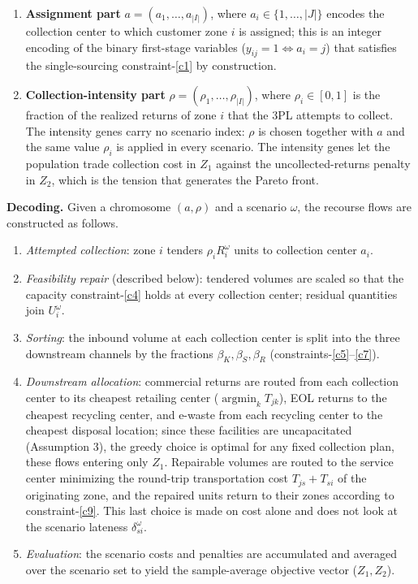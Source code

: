 \documentclass[11pt, a4paper]{article}
\DeclareMathOperator*{\argmin}{argmin}
\begin{document}
\begin{enumerate}
\def\labelenumi{\arabic{enumi}.}
\item
  \textbf{Assignment part} $a = (a_1, \ldots, a_{|I|})$, where $a_i \in \{1, \ldots, |J|\}$ encodes the collection center to which customer zone $i$ is assigned; this is an integer encoding of the binary first-stage variables ($y_{ij} = 1 \Leftrightarrow a_i = j$) that satisfies the single-sourcing constraint-\eqref{c1} by construction.
\item
  \textbf{Collection-intensity part}
  $\rho = (\rho_1, \ldots, \rho_{|I|})$, where $\rho_i \in [0,1]$ is the fraction of the realized returns of zone $i$ that the 3PL attempts to collect. The intensity genes carry no scenario index: $\rho$ is chosen together with $a$ and the same value $\rho_i$ is applied in every scenario. The intensity genes let the population trade collection cost in $Z_1$ against the uncollected-returns penalty in $Z_2$, which is the tension that generates the Pareto
  front.
\end{enumerate}

\textbf{Decoding.} Given a chromosome $(a, \rho)$ and a scenario $\omega$, the recourse flows are constructed as follows.

\begin{enumerate}
\def\labelenumi{\arabic{enumi}.}
\item
  \emph{Attempted collection}: zone $i$ tenders $\rho_i R_i^{\omega}$ units to collection center $a_i$.
\item
  \emph{Feasibility repair} (described below): tendered volumes are
  scaled so that the capacity constraint-\eqref{c4} holds at every collection center; residual quantities join $U_i^{\omega}$.
\item
  \emph{Sorting}: the inbound volume at each collection center is split into the three downstream channels by the fractions $\beta_K, \beta_S, \beta_R$ (constraints-\eqref{c5}--\eqref{c7}).
\item
  \emph{Downstream allocation}: commercial returns are routed from each collection center to its cheapest retailing center ($\argmin_k T_{jk}$), EOL returns to the cheapest recycling center, and e-waste from each recycling center to the cheapest disposal location; since these facilities are uncapacitated (Assumption 3), the
  greedy choice is optimal for any fixed collection plan, these flows entering only $Z_1$. Repairable volumes are routed to the service center minimizing the round-trip transportation cost $T_{js} + T_{si}$ of the originating zone, and the repaired units return to their zones according to constraint-\eqref{c9}. This last choice is made on cost alone and does not look at the scenario lateness $\delta_{si}^{\omega}$.
\item
  \emph{Evaluation}: the scenario costs and penalties are accumulated and averaged over the scenario set to yield the sample-average objective vector ($Z_1, Z_2$).
\end{enumerate}
\end{document}
